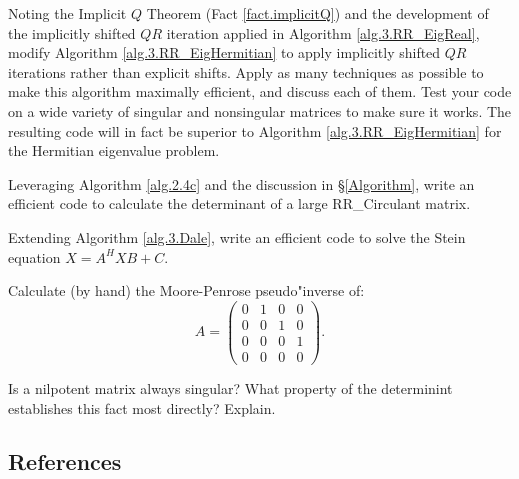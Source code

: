 \begin{exercise} \label{ex:04.impshiftherm} \rm Noting the Implicit $Q$ Theorem (Fact \ref{fact.implicitQ}) and the development of the implicitly shifted $QR$ iteration
applied in Algorithm \ref{alg.3.RR_EigReal}, modify Algorithm \ref{alg.3.RR_EigHermitian} to apply implicitly shifted $QR$ iterations rather than explicit shifts.  Apply as many
techniques as possible to make this algorithm maximally efficient, and discuss each of them.  Test your code on a wide variety of singular and nonsingular matrices
to make sure it works.  The resulting code will in fact be superior to Algorithm \ref{alg.3.RR_EigHermitian} for the Hermitian eigenvalue problem.
\end{exercise}

\begin{exercise} \label{ex:04.det} \rm Leveraging Algorithm \ref{alg.2.4c} and the discussion in \S \ref{Algorithm},
write an efficient code to calculate the determinant of a large RR_Circulant matrix.
\end{exercise}

\begin{exercise} \label{ex:04.stein} \rm Extending Algorithm \ref{alg.3.Dale}, write an efficient code to solve the Stein equation $X = A^H X B + C$.
\end{exercise}

\begin{exercise} \label{ex:04.pseudoinverse} \rm Calculate (by hand) the Moore-Penrose pseudo"inverse of:
\begin{equation*}
A=\begin{pmatrix} 0 & 1 & 0 & 0\\ 0 & 0 & 1 & 0\\ 0 & 0 & 0 & 1\\ 0 & 0 & 0 & 0 \end{pmatrix}.
\end{equation*}
\end{exercise}

\begin{exercise} \label{ex:04.nilpotent.singular} \rm Is a nilpotent matrix always singular?  What property of the determinint establishes this fact most
directly?  Explain.
\end{exercise}

\subsection*{References}\label{sec:04.References}

